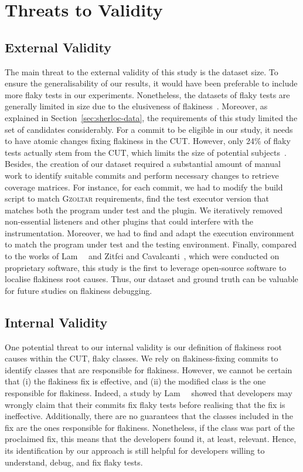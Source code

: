 \section{Threats to Validity}
\label{sec:sherloc-threats}

\subsection{External Validity}
The main threat to the external validity of this study is the dataset size.
To ensure the generalisability of our results, it would have been preferable to include more flaky tests in our experiments. 
Nonetheless, the datasets of flaky tests are generally limited in size due to the elusiveness of flakiness~\cite{habchi2021mutinject,Haben2021,FlakeFlagger}.
Moreover, as explained in Section~\ref{sec:sherloc-data}, the requirements of this study limited the set of candidates considerably.
For a commit to be eligible in our study, it needs to have atomic changes fixing flakiness in the CUT.
However, only 24\% of flaky tests actually stem from the CUT, which limits the size of potential subjects~\cite{Luo2014}.
Besides, the creation of our dataset required a substantial amount of manual work to identify suitable commits and perform necessary changes to retrieve coverage matrices.
For instance, for each commit, we had to modify the build script to match \textsc{Gzoltar} requirements, \ie find the test executor version that matches both the program under test and the plugin.
We iteratively removed non-essential listeners and other plugins that could interfere with the instrumentation.
Moreover, we had to find and adapt the execution environment to match the program under test and the testing environment.
Finally, compared to the works of Lam~\etal~\cite{Lam2019RootCausing} and Zitfci and Cavalcanti~\cite{ziftci2020flake}, which were conducted on proprietary software, this study is the first to leverage open-source software to localise flakiness root causes.
Thus, our dataset and ground truth can be valuable for future studies on flakiness debugging.

\subsection{Internal Validity}
One potential threat to our internal validity is our definition of flakiness root causes within the CUT, \ie flaky classes.
We rely on flakiness-fixing commits to identify classes that are responsible for flakiness.
However, we cannot be certain that (i) the flakiness fix is effective, and (ii) the modified class is the one responsible for flakiness.
Indeed, a study by Lam~\etal~\cite{Lam2020a} showed that developers may wrongly claim that their commits fix flaky tests before realising that the fix is ineffective.
Additionally, there are no guarantees that the classes included in the fix are the ones responsible for flakiness.
Nonetheless, if the class was part of the proclaimed fix, this means that the developers found it, at least, relevant. Hence, its identification by our approach is still helpful for developers willing to understand, debug, and fix flaky tests.

